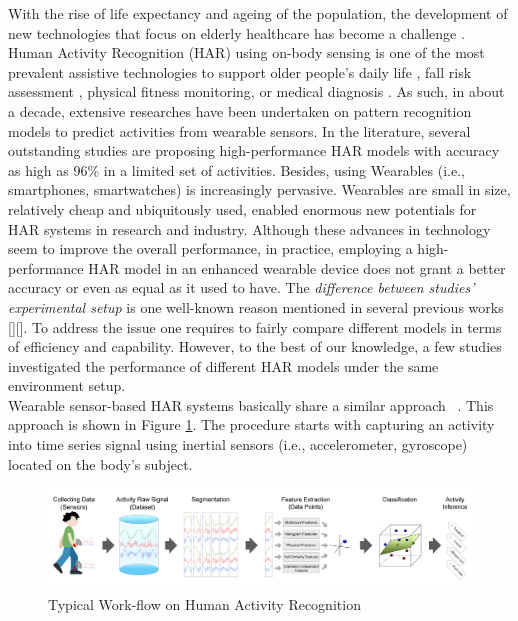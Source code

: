 \documentclass[journal,article,submit,moreauthors,pdftex]{Definitions/mdpi}
\begin{document}
With the rise of life expectancy and ageing of the population, the development of new technologies that focus on elderly healthcare has become a challenge \cite{hong2008activity}. Human Activity Recognition (HAR) using on-body sensing is one of the most prevalent assistive technologies to support older people's daily life \cite{wang2019survey}, fall risk assessment \cite{sow2013mining}, physical fitness monitoring\cite{morris2014recofit}, or medical diagnosis \cite{gonzalez2015features}. As such, in about a decade, extensive researches have been undertaken on pattern recognition models to predict activities from wearable sensors.  In the literature, several outstanding studies are proposing high-performance HAR models with accuracy as high as 96\% in a limited set of activities. Besides, using Wearables (i.e., smartphones, smartwatches) is increasingly pervasive. Wearables are small in size, relatively cheap and ubiquitously used, enabled enormous new potentials for HAR systems in research and industry. Although these advances in technology seem to improve the overall performance, in practice, employing a high-performance HAR model in an enhanced wearable device does not grant a better accuracy or even as equal as it used to have. The \textit{difference between studies' experimental setup} is one well-known reason mentioned in several previous works \cite{schilit1994context}[][]. To address the issue one requires to fairly compare different models in terms of efficiency and capability. However, to the best of our knowledge, a few studies investigated the performance of different HAR models under the same environment setup.\\

Wearable sensor-based HAR systems basically share a similar approach ~\cite{s140610146}. This approach is shown in Figure \ref{fig:main_approach}. The procedure starts with capturing an activity into time series signal using inertial sensors (i.e., accelerometer, gyroscope) located on the body's subject. 

\begin{figure}[H]
	\centering
	\includegraphics[width=15.5 cm]{Definitions/images/main_approach.jpg}
	\caption{Typical Work-flow on Human Activity Recognition}
	\label{fig:main_approach}
\end{figure} 
\end{document}
